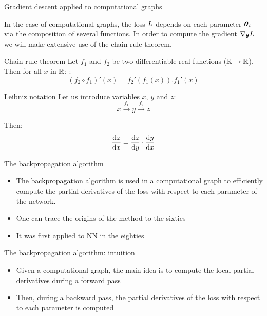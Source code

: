 \documentclass[xcolor=pdftex,dvipsnames,table,mathserif]{beamer}
\begin{document}
\begin{frame}{Gradient descent applied to computational graphs}

  In the case of computational graphs, the loss $L$ depends on each parameter $\boldsymbol{\theta}_i$ via the composition of several functions. In order to compute the gradient $\nabla_{\boldsymbol{\theta}}L$ we will make extensive use of the chain rule theorem.

  \begin{block}{Chain rule theorem}
    Let $f_1$ and $f_2$ be two differentiable real functions ($\mathbb{R} \rightarrow \mathbb{R}$). Then for all $x$ in $\mathbb{R}$:   :
    \[
     (f_2 \circ f_1)'(x) = f_2'(f_1(x)).f_1'(x)
    \]
  \end{block}


\begin{block}{Leibniz notation}
  Let us introduce variables $x$, $y$ and $z$:
  \[x \xrightarrow{f_1} y \xrightarrow{f_2} z\]

  Then:
  \[\dv{z}{x} = \dv{z}{y} \cdot \dv{y}{x} \]

\end{block}

\end{frame}


\begin{frame}{The backpropagation algorithm}

  \begin{itemize}
  \item The backpropagation algorithm is used in a computational graph to efficiently compute the partial derivatives of the loss with respect to each parameter of the network.
  \item One can trace the origins of the method to the sixties
  \item It was first applied to NN in the eighties \cite{werbos_applications_1982, lecun_procedure_1985}
  \end{itemize}


\end{frame}


\begin{frame}{The backpropagation algorithm: intuition}

  \begin{itemize}
  \item Given a computational graph, the main idea is to compute the local partial derivatives during a forward pass
    \item Then, during a backward pass, the partial derivatives of the loss with respect to each parameter is computed
  \end{itemize}


\end{frame}
\end{document}
